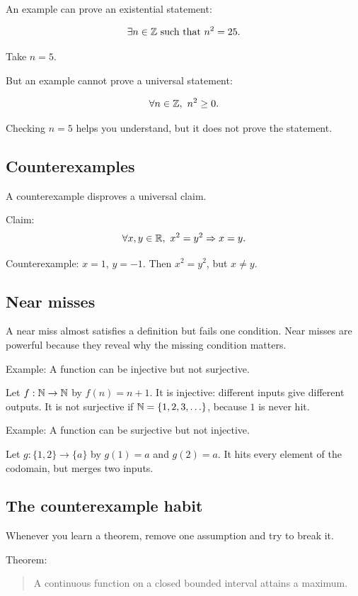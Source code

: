 \documentclass[12pt]{article}
\begin{document}
An example can prove an existential statement:

\[
\exists n\in\mathbb{Z}\text{ such that }n^2=25.
\]

Take $n=5$.

But an example cannot prove a universal statement:

\[
\forall n\in\mathbb{Z},\ n^2\geq0.
\]

Checking $n=5$ helps you understand, but it does not prove the statement.

\subsection{Counterexamples}

A counterexample disproves a universal claim.

Claim:
\[
\forall x,y\in\R,\ x^2=y^2\Rightarrow x=y.
\]

Counterexample: $x=1$, $y=-1$. Then $x^2=y^2$, but $x\neq y$.

\subsection{Near misses}

A near miss almost satisfies a definition but fails one condition. Near misses are powerful because they reveal why the missing condition matters.

Example: A function can be injective but not surjective.

Let $f:\mathbb{N}\to\mathbb{N}$ by $f(n)=n+1$. It is injective: different inputs give different outputs. It is not surjective if $\mathbb{N}=\{1,2,3,\ldots\}$, because $1$ is never hit.

Example: A function can be surjective but not injective.

Let $g:\{1,2\}\to\{a\}$ by $g(1)=a$ and $g(2)=a$. It hits every element of the codomain, but merges two inputs.

\subsection{The counterexample habit}

Whenever you learn a theorem, remove one assumption and try to break it.

Theorem:

\begin{quote}
A continuous function on a closed bounded interval attains a maximum.
\end{quote}
\end{document}
